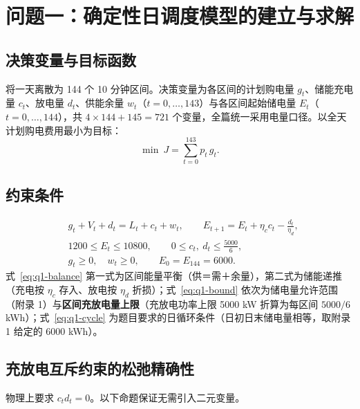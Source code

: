 
\section{问题一：确定性日调度模型的建立与求解}

\subsection{决策变量与目标函数}

将一天离散为 144 个 10 分钟区间。决策变量为各区间的计划购电量 $g_t$、储能充电量 $c_t$、放电量 $d_t$、供能余量 $w_t$（$t=0,\dots,143$）与各区间起始储电量 $E_t$（$t=0,\dots,144$），共 $4\times144+145=721$ 个变量，全篇统一采用电量口径。以全天计划购电费用最小为目标：
\begin{equation}
  \min\ J=\sum_{t=0}^{143}p_t\,g_t .
\end{equation}

\subsection{约束条件}
\label{sec:q1-constraint}

\begin{align}
  &g_t+V_t+d_t=L_t+c_t+w_t, \qquad E_{t+1}=E_t+\eta_c c_t-\frac{d_t}{\eta_d}, \label{eq:q1-balance}\\
  &1200\le E_t\le 10800, \qquad 0\le c_t,\ d_t\le \frac{5000}{6}, \label{eq:q1-bound}\\
  &g_t\ge 0,\quad w_t\ge 0,\qquad E_0=E_{144}=6000. \label{eq:q1-cycle}
\end{align}
式~\eqref{eq:q1-balance} 第一式为区间能量平衡（供＝需＋余量），第二式为储能递推（充电按 $\eta_c$ 存入、放电按 $\eta_d$ 折损）；式~\eqref{eq:q1-bound} 依次为储电量允许范围（附录 1）与\textbf{区间充放电量上限}（充放电功率上限 5000 kW 折算为每区间 $5000/6$ kWh）；式~\eqref{eq:q1-cycle} 为题目要求的日循环条件（日初日末储电量相等，取附录 1 给定的 6000 kWh）。

\subsection{充放电互斥约束的松弛精确性}
\label{sec:q1-relax}

物理上要求 $c_t d_t=0$。以下命题保证无需引入二元变量。

